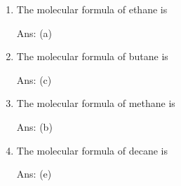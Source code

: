 \documentclass[main.tex]{subfiles}
\begin{document}
\begin{multicols*}{2}
\begin{enumerate}
\item The molecular formula of ethane is
 \vspace{0.3cm}\begin{enumerate}[label=(\alph*)]
  \begin{flushright}\small Ans: (a) \end{flushright}
\end{enumerate}

\item The molecular formula of butane is
\vspace{0.3cm}\begin{enumerate}[label=(\alph*)]
 \begin{flushright}\small Ans: (c) \end{flushright}
\end{enumerate}
\item The molecular formula of methane is
\vspace{0.3cm}\begin{enumerate}[label=(\alph*)]
 \begin{flushright}\small Ans: (b) \end{flushright}
\end{enumerate}
\item The molecular formula of decane is
\vspace{0.3cm}\begin{enumerate}[label=(\alph*)]
 \begin{flushright}\small Ans: (e) \end{flushright}
\end{enumerate}


\end{enumerate}
\end{multicols*}
\end{document}

